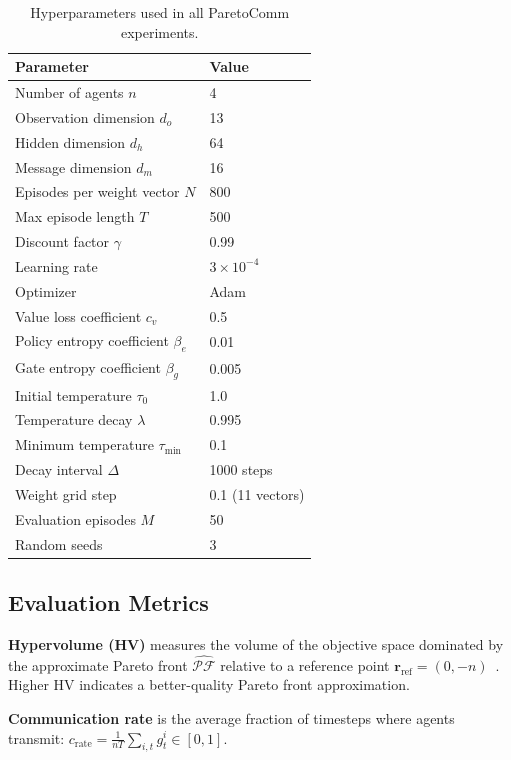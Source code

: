 \documentclass[runningheads]{llncs}
\newcommand{\PF}{\mathcal{PF}}
\begin{document}
\begin{table}[t]
\centering
\caption{Hyperparameters used in all ParetoComm experiments.}
\label{tab:hyperparams}
\begin{tabular}{ll}
\toprule
\textbf{Parameter} & \textbf{Value} \\
\midrule
Number of agents $n$ & 4 \\
Observation dimension $d_o$ & 13 \\
Hidden dimension $d_h$ & 64 \\
Message dimension $d_m$ & 16 \\
Episodes per weight vector $N$ & 800 \\
Max episode length $T$ & 500 \\
Discount factor $\gamma$ & 0.99 \\
Learning rate & $3 \times 10^{-4}$ \\
Optimizer & Adam~\cite{kingma2014adam} \\
Value loss coefficient $c_v$ & 0.5 \\
Policy entropy coefficient $\beta_e$ & 0.01 \\
Gate entropy coefficient $\beta_g$ & 0.005 \\
Initial temperature $\tau_0$ & 1.0 \\
Temperature decay $\lambda$ & 0.995 \\
Minimum temperature $\tau_\text{min}$ & 0.1 \\
Decay interval $\Delta$ & 1000 steps \\
Weight grid step & 0.1 (11 vectors) \\
Evaluation episodes $M$ & 50 \\
Random seeds & 3 \\
\bottomrule
\end{tabular}
\end{table}

\subsection{Evaluation Metrics}

\textbf{Hypervolume (HV)} measures the volume of the objective space
dominated by the approximate Pareto front $\hat{\PF}$ relative to a
reference point $\mathbf{r}_\text{ref} = (0, -n)$~\cite{zitzler2003performance}.
Higher HV indicates a better-quality Pareto front approximation.

\textbf{Communication rate} is the average fraction of timesteps
where agents transmit:
$c_\text{rate} = \frac{1}{nT}\sum_{i,t} g^i_t \in [0,1]$.
\end{document}
